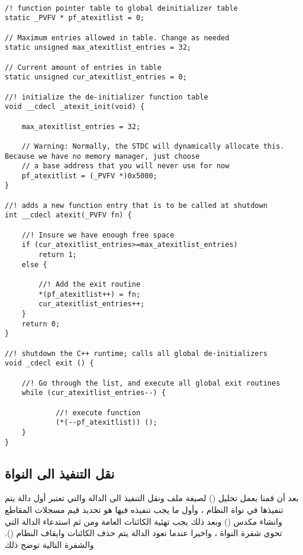 \documentclass[document.tex]{subfiles}
\begin{document}
\begin{english}

\lstset{numberstyle=\tiny,numbersep=5pt,tabsize=2,extendedchars=true,breaklines=true,frame=b,showspaces=false, showtabs=false,xleftmargin=10pt,framexleftmargin=10pt,framexrightmargin=5pt,framexbottommargin=4pt,showstringspaces=false,language=C++}

\begin{lstlisting}[label=newdelete,caption=Global new/delete operator]

/! function pointer table to global deinitializer table
static _PVFV * pf_atexitlist = 0;

// Maximum entries allowed in table. Change as needed
static unsigned max_atexitlist_entries = 32;

// Current amount of entries in table
static unsigned cur_atexitlist_entries = 0;

//! initialize the de-initializer function table
void __cdecl _atexit_init(void) {

    max_atexitlist_entries = 32;

	// Warning: Normally, the STDC will dynamically allocate this. Because we have no memory manager, just choose
	// a base address that you will never use for now
	pf_atexitlist = (_PVFV *)0x5000;
}

//! adds a new function entry that is to be called at shutdown
int __cdecl atexit(_PVFV fn) {

	//! Insure we have enough free space
	if (cur_atexitlist_entries>=max_atexitlist_entries)
		return 1;
	else {

		//! Add the exit routine
		*(pf_atexitlist++) = fn;
		cur_atexitlist_entries++;
	}
	return 0;
}

//! shutdown the C++ runtime; calls all global de-initializers
void _cdecl exit () {

	//! Go through the list, and execute all global exit routines
	while (cur_atexitlist_entries--) {

			//! execute function
			(*(--pf_atexitlist)) ();
	}
}

\end{lstlisting}
\end{english}

\subsection{نقل التنفيذ الى النواة}
بعد أن قمنا بعمل تحليل () لصيغة ملف  ونقل التنفيذ الى الدالة  والتي تعتبر أول دالة يتم تنفيذها في نواة النظام ، وأول ما يجب تنفيذه فيها هو تحديد قيم مسجلات المقاطع وانشاء مكدس () وبعد ذلك يجب تهئية الكائنات العامة ومن ثم استدعاء الدالة  التي تحوي شفرة النواة ، واخيرا عندما تعود الدالة  يتم حذف الكائنات وايقاف النظام (). والشفرة التالية توضح ذلك
\end{document}
